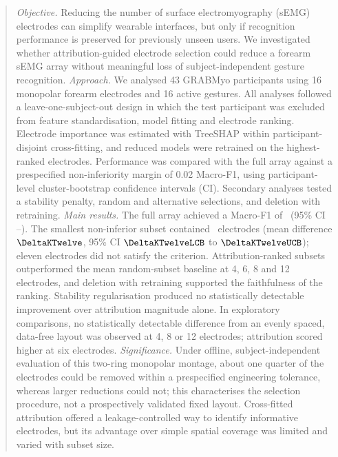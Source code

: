 \documentclass{iopjournal}
\newif\ifshowchanges
\newcommand{\chg}[1]{\ifshowchanges{\color{blue}#1}\else{#1}\fi}
\begin{document}
\begin{abstract}
\justifying
\textit{Objective.} Reducing the number of surface electromyography (sEMG) electrodes can simplify wearable interfaces, but only if recognition performance is preserved for previously unseen users. We investigated whether attribution-guided electrode selection could reduce a forearm sEMG array without meaningful loss of subject-independent gesture recognition.
\textit{Approach.} We analysed 43 GRABMyo participants using 16 monopolar forearm electrodes and 16 active gestures. All analyses followed a leave-one-subject-out design in which the test participant was excluded from feature standardisation, model fitting and electrode ranking. Electrode importance was estimated with TreeSHAP within participant-disjoint cross-fitting, and reduced models were retrained on the highest-ranked electrodes. Performance was compared with the full array against a prespecified non-inferiority margin of 0.02 Macro-F1, using participant-level cluster-bootstrap confidence intervals (CI). \chg{Secondary analyses tested a stability penalty, random and alternative selections, and deletion with retraining.}
\textit{Main results.} The full array achieved a Macro-F1 of \FullXGB\ (95\% CI \FullXGBLCB--\FullXGBUCB). The smallest non-inferior subset contained \KStar\ electrodes (mean difference $\DeltaKTwelve$, 95\% CI $\DeltaKTwelveLCB$ to $\DeltaKTwelveUCB$); eleven electrodes did not satisfy the criterion. \chg{Attribution-ranked subsets outperformed the mean random-subset baseline} at 4, 6, 8 and 12 electrodes, and deletion with retraining supported the faithfulness of the ranking. Stability regularisation produced no statistically detectable improvement over attribution magnitude alone. In exploratory comparisons, no statistically detectable difference from an evenly spaced, data-free layout was observed at 4, 8 or 12 electrodes; attribution scored higher at six electrodes.
\textit{Significance.} Under offline, subject-independent evaluation of this two-ring monopolar montage, about one quarter of the electrodes could be removed within a prespecified engineering tolerance, whereas larger reductions could not; \chg{this characterises the selection procedure, not a prospectively validated fixed layout.} Cross-fitted attribution offered a leakage-controlled way to identify informative electrodes, but its advantage over simple spatial coverage was limited and varied with subset size.
\end{abstract}






\end{document}
